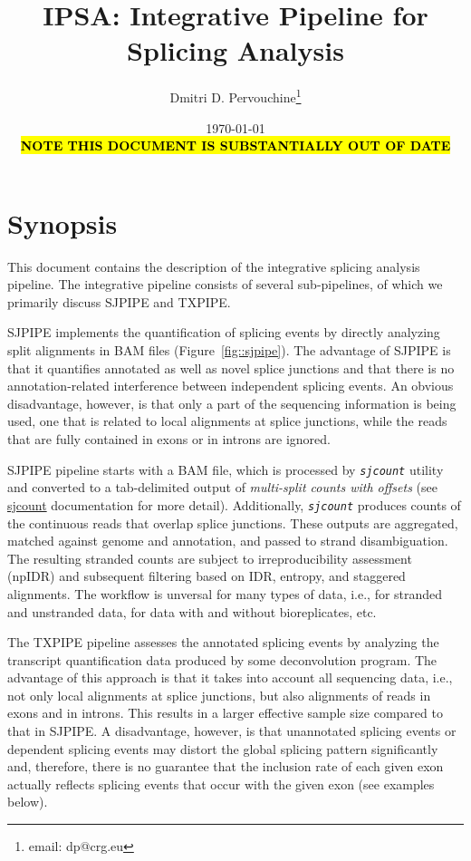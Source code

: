 \documentclass{article}
\newcommand{\prog}[1]{{\tt\em #1}}
\begin{document}
\title{IPSA: Integrative Pipeline for Splicing Analysis}
\author{Dmitri D. Pervouchine\thanks{email: dp@crg.eu}}

\date{\today\\\hl{\bf NOTE THIS DOCUMENT IS SUBSTANTIALLY OUT OF DATE}}
\maketitle
\tableofcontents

\section{Synopsis}
This document contains the description of the integrative splicing analysis pipeline. The integrative pipeline
consists of several sub-pipelines, of which we primarily discuss SJPIPE and TXPIPE.

SJPIPE implements the quantification of splicing events by directly analyzing split alignments 
in BAM files (Figure~\ref{fig::sjpipe}). The advantage of SJPIPE is that it quantifies annotated 
as well as novel splice junctions and that there is no annotation-related interference between 
independent splicing events. An obvious disadvantage, however, is that only a part of the 
sequencing information is being used, one that is related to local alignments at splice junctions, 
while the reads that are fully contained in exons or in introns are ignored.

SJPIPE pipeline starts with a BAM file, which is processed by \prog{sjcount} utility and converted to a tab-delimited 
output of {\em multi-split counts with offsets} (see \href{https://github.com/pervouchine/sjcount}{sjcount} documentation 
for more detail). Additionally, \prog{sjcount} produces counts of the continuous reads that overlap splice junctions.
These outputs are aggregated, matched against genome and annotation, and passed to strand disambiguation.
The resulting stranded counts are subject to irreproducibility assessment (npIDR) and subsequent filtering 
based on IDR, entropy, and staggered alignments. The workflow is unversal for many types of data, i.e., for stranded 
and unstranded data, for data with and without bioreplicates, etc.

The TXPIPE pipeline assesses the annotated splicing events by analyzing the transcript quantification data produced 
by some deconvolution program. The advantage of this approach is that it takes into account all sequencing data, i.e., 
not only local alignments at splice junctions, but also alignments of reads in exons and in introns. This results in 
a larger effective sample size compared to that in SJPIPE. A disadvantage, however, is that unannotated splicing events
or dependent splicing events may distort the global splicing pattern significantly and, therefore, there is no guarantee 
that the inclusion rate of each given exon actually reflects splicing events that occur with the given exon (see examples 
below).
\end{document}
